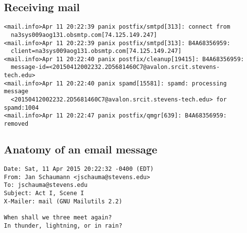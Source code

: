 \documentclass[xga]{xdvislides}
\begin{document}
\subsection{Receiving mail}
\begin{verbatim}
<mail.info>Apr 11 20:22:39 panix postfix/smtpd[313]: connect from
  na3sys009aog131.obsmtp.com[74.125.149.247]
<mail.info>Apr 11 20:22:39 panix postfix/smtpd[313]: B4A68356959:
  client=na3sys009aog131.obsmtp.com[74.125.149.247]
<mail.info>Apr 11 20:22:40 panix postfix/cleanup[19415]: B4A68356959:
  message-id=<20150412002232.2D5681460C7@avalon.srcit.stevens-tech.edu>
<mail.info>Apr 11 20:22:40 panix spamd[15581]: spamd: processing message
  <20150412002232.2D5681460C7@avalon.srcit.stevens-tech.edu> for spamd:1004
<mail.info>Apr 11 20:22:47 panix postfix/qmgr[639]: B4A68356959: removed
\end{verbatim}


\subsection{Anatomy of an email message}
\begin{verbatim}
Date: Sat, 11 Apr 2015 20:22:32 -0400 (EDT)                                                         
From: Jan Schaumann <jschauma@stevens.edu>                                                          
To: jschauma@stevens.edu                                                                            
Subject: Act I, Scene I                                                                             
X-Mailer: mail (GNU Mailutils 2.2)                                                                  

When shall we three meet again?
In thunder, lightning, or in rain?

\end{verbatim}
\end{document}
